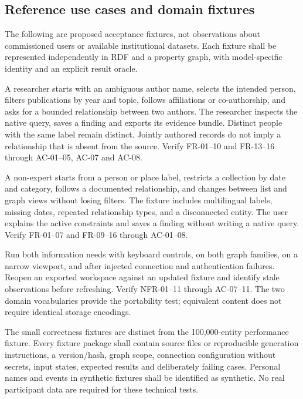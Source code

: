 \documentclass[11pt,a4paper]{article}
\begin{document}
\subsection{Reference use cases and domain fixtures}
The following are proposed acceptance fixtures, not observations about commissioned users or available institutional datasets. Each fixture shall be represented independently in RDF and a property graph, with model-specific identity and an explicit result oracle.
\begin{description}[leftmargin=0pt,labelindent=0pt,labelwidth=0pt,style=nextline]
\item[UC-01: Research-publication exploration.] A researcher starts with an ambiguous author name, selects the intended person, filters publications by year and topic, follows affiliations or co-authorship, and asks for a bounded relationship between two authors. The researcher inspects the native query, saves a finding and exports its evidence bundle. Distinct people with the same label remain distinct. Jointly authored records do not imply a relationship that is absent from the source. Verify FR-01--10 and FR-13--16 through AC-01--05, AC-07 and AC-08.
\item[UC-02: Cultural-heritage exploration.] A non-expert starts from a person or place label, restricts a collection by date and category, follows a documented relationship, and changes between list and graph views without losing filters. The fixture includes multilingual labels, missing dates, repeated relationship types, and a disconnected entity. The user explains the active constraints and saves a finding without writing a native query. Verify FR-01--07 and FR-09--16 through AC-01--08.
\item[UC-03: Recovery and portability.] Run both information needs with keyboard controls, on both graph families, on a narrow viewport, and after injected connection and authentication failures. Reopen an exported workspace against an updated fixture and identify stale observations before refreshing. Verify NFR-01--11 through AC-07--11. The two domain vocabularies provide the portability test; equivalent content does not require identical storage encodings.
\end{description}

The small correctness fixtures are distinct from the 100,000-entity performance fixture. Every fixture package shall contain source files or reproducible generation instructions, a version/hash, graph scope, connection configuration without secrets, input states, expected results and deliberately failing cases. Personal names and events in synthetic fixtures shall be identified as synthetic. No real participant data are required for these technical tests.
\end{document}
